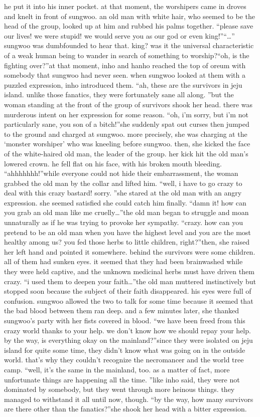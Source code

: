  he put it into his inner pocket.
at that moment, the worshipers came in droves and knelt in front of sungwoo.
 an old man with white hair, who seemed to be the head of the group, looked up at him and rubbed his palms together.
“please save our lives! we were stupid! we would serve you as our god or even king!”“…”
sungwoo was dumbfounded to hear that.
 king? was it the universal characteristic of a weak human being to wander in search of something to worship?“oh, is the fighting over?”at that moment, inho and hanho reached the top of oreum with somebody that sungwoo had never seen.
when sungwoo looked at them with a puzzled expression, inho introduced them.
“ah, these are the survivors in jeju island.
 unlike those fanatics, they were fortunately sane all along.
”but the woman standing at the front of the group of survivors shook her head.
there was murderous intent on her expression for some reason.
“oh, i’m sorry, but i’m not particularly sane, you son of a bitch!”she suddenly spat out curses then jumped to the ground and charged at sungwoo.
more precisely, she was charging at the ‘monster worshiper’ who was kneeling before sungwoo.
 then, she kicked the face of the white-haired old man, the leader of the group.
her kick hit the old man’s lowered crown.
 he fell flat on his face, with his broken mouth bleeding.
“ahhhhhhh!”while everyone could not hide their embarrassment, the woman grabbed the old man by the collar and lifted him.
“well, i have to go crazy to deal with this crazy bastard! sorry.
”she stared at the old man with an angry expression.
 she seemed satisfied she could catch him finally.
“damn it! how can you grab an old man like me cruelly…”the old man began to struggle and moan unnaturally as if he was trying to provoke her sympathy.
“crazy.
 how can you pretend to be an old man when you have the highest level and you are the most healthy among us? you fed those herbs to little children, right?”then, she raised her left hand and pointed it somewhere.
 behind the survivors were some children.
 all of them had sunken eyes.
it seemed that they had been brainwashed while they were held captive, and the unknown medicinal herbs must have driven them crazy.
“i used them to deepen your faith…”the old man muttered instinctively but stopped soon because the subject of their faith disappeared.
 his eyes were full of confusion.
sungwoo allowed the two to talk for some time because it seemed that the bad blood between them ran deep.
 and a few minutes later, she thanked sungwoo’s party with her fists covered in blood.
“we have been freed from this crazy world thanks to your help.
 we don’t know how we should repay your help.
 by the way, is everything okay on the mainland?”since they were isolated on jeju island for quite some time, they didn’t know what was going on in the outside world.
that’s why they couldn’t recognize the necromancer and the world tree camp.
“well, it’s the same in the mainland, too.
 as a matter of fact, more unfortunate things are happening all the time.
”like inho said, they were not dominated by somebody, but they went through more heinous things.
 they managed to withstand it all until now, though.
“by the way, how many survivors are there other than the fanatics?”she shook her head with a bitter expression.


